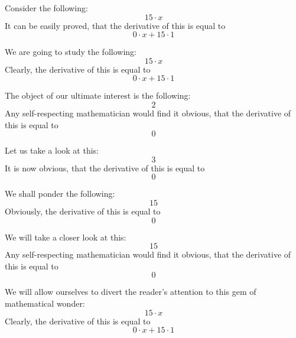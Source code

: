 \documentclass{article}
\begin{document}
Consider the following:
\begin{equation}
15 \cdot x 
\end{equation}
It can be easily proved, that the derivative of this is equal to
\begin{equation}
0 \cdot x + 15 \cdot 1 
\end{equation}

We are going to study the following:
\begin{equation}
15 \cdot x 
\end{equation}
Clearly, the derivative of this is equal to
\begin{equation}
0 \cdot x + 15 \cdot 1 
\end{equation}

The object of our ultimate interest is the following:
\begin{equation}
2 
\end{equation}
Any self-respecting mathematician would find it obvious, that the derivative of this is equal to
\begin{equation}
0 
\end{equation}

Let us take a look at this:
\begin{equation}
3 
\end{equation}
It is now obvious, that the derivative of this is equal to
\begin{equation}
0 
\end{equation}

We shall ponder the following:
\begin{equation}
15 
\end{equation}
Obviously, the derivative of this is equal to
\begin{equation}
0 
\end{equation}

We will take a closer look at this:
\begin{equation}
15 
\end{equation}
Any self-respecting mathematician would find it obvious, that the derivative of this is equal to
\begin{equation}
0 
\end{equation}

We will allow ourselves to divert the reader's attention to this gem of mathematical wonder:
\begin{equation}
15 \cdot x 
\end{equation}
Clearly, the derivative of this is equal to
\begin{equation}
0 \cdot x + 15 \cdot 1 
\end{equation}
\end{document}
